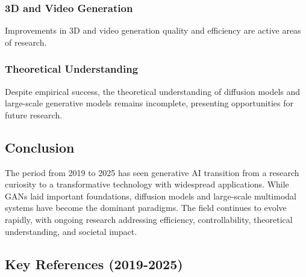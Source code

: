 \subsubsection*{3D and Video Generation}
Improvements in 3D and video generation quality and efficiency are active areas of research.

\subsubsection*{Theoretical Understanding}
Despite empirical success, the theoretical understanding of diffusion models and large-scale generative models remains incomplete, presenting opportunities for future research.

\subsection*{Conclusion}

The period from 2019 to 2025 has seen generative AI transition from a research curiosity to a transformative technology with widespread applications. While GANs laid important foundations, diffusion models and large-scale multimodal systems have become the dominant paradigms. The field continues to evolve rapidly, with ongoing research addressing efficiency, controllability, theoretical understanding, and societal impact.

\subsection*{Key References (2019-2025)}

